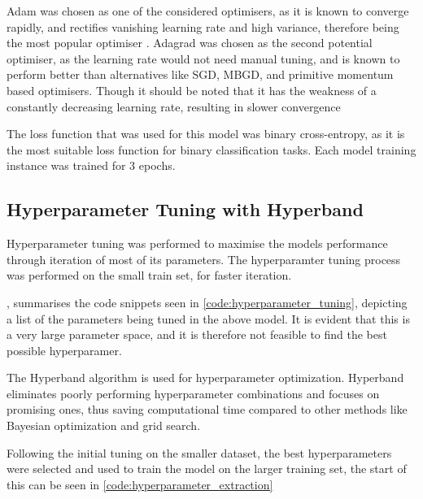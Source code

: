 Adam was chosen as one of the considered optimisers, as it is known to converge rapidly, and rectifies vanishing learning rate and high variance, therefore being the most popular optimiser \cite{RAIAAN2024100470}. Adagrad was chosen as the second potential optimiser, as the learning rate would not need manual tuning, and is known to perform better than alternatives like SGD, MBGD, and primitive momentum based optimisers. Though it should be noted that it has the weakness of a constantly decreasing learning rate, resulting in slower convergence \cite{RAIAAN2024100470}

The loss function that was used for this model was binary cross-entropy, as it is the most suitable loss function for binary classification tasks. Each model training instance was trained for 3 epochs. 

\newpage

\subsection{Hyperparameter Tuning with Hyperband}

Hyperparameter tuning was performed to maximise the models performance through iteration of most of its parameters. The hyperparamter tuning process was performed on the small train set, for faster iteration.

, summarises the code snippets seen in \cref{code:hyperparameter_tuning}, depicting a list of the parameters being tuned in the above model. It is evident that this is a very large parameter space, and it is therefore not feasible to find the best possible hyperparamer.

The Hyperband algorithm is used for hyperparameter optimization. Hyperband eliminates poorly performing hyperparameter combinations and focuses on promising ones, thus saving computational time compared to other methods like Bayesian optimization and grid search. 

Following the initial tuning on the smaller dataset, the best hyperparameters were selected and used to train the model on the larger training set, the start of this can be seen in \cref{code:hyperparameter_extraction}

\begin{figure}[h]
    
\end{figure}

